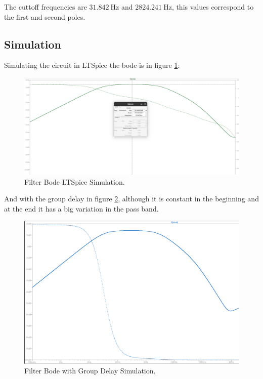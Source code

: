 The cuttoff frequencies are $\SI{31.842}{\hertz}$ and $\SI{2824.241}{\hertz}$, this values correspond to the first and second poles.

\subsection{Simulation}

Simulating the circuit in LTSpice the bode is in figure \ref{fig:P2BodeLT}:

\begin{figure}[H]
    \centering
    \includegraphics*[scale = 0.25]{Images/P2BodeLt.png}
    \caption{Filter Bode LTSpice Simulation.}
    \label{fig:P2BodeLT}
\end{figure}

And with the group delay in figure \ref{fig:P2Group}, although it is constant in the beginning and at the end it has a big variation in the pass band.
\begin{figure}[H]
    \centering
    \includegraphics*[scale = 0.25]{Images/P2Group.png}
    \caption{Filter Bode with Group Delay Simulation.}
    \label{fig:P2Group}
\end{figure}

